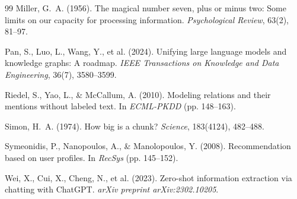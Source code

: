 \documentclass[11pt]{article}
\begin{document}
\begin{thebibliography}{99}
Miller, G.~A. (1956).
The magical number seven, plus or minus two: Some limits on our capacity for processing information.
\textit{Psychological Review}, 63(2), 81--97.

Pan, S., Luo, L., Wang, Y., et al. (2024).
Unifying large language models and knowledge graphs: A roadmap.
\textit{IEEE Transactions on Knowledge and Data Engineering}, 36(7), 3580--3599.

Riedel, S., Yao, L., \& McCallum, A. (2010).
Modeling relations and their mentions without labeled text.
In \textit{ECML-PKDD} (pp. 148--163).

Simon, H.~A. (1974).
How big is a chunk?
\textit{Science}, 183(4124), 482--488.

Symeonidis, P., Nanopoulos, A., \& Manolopoulos, Y. (2008).
Recommendation based on user profiles.
In \textit{RecSys} (pp. 145--152).

Wei, X., Cui, X., Cheng, N., et al. (2023).
Zero-shot information extraction via chatting with ChatGPT.
\textit{arXiv preprint arXiv:2302.10205}.

\end{thebibliography}
\end{document}
